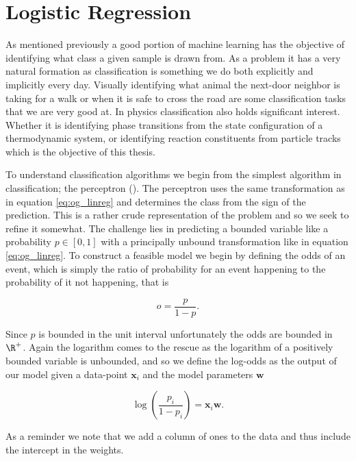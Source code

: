 
\section{Logistic Regression}\label{sec:LogReg}

As mentioned previously a good portion of machine learning has the objective of identifying what class a given sample is drawn from. As a problem it has a very natural formation as classification is something we do both explicitly and implicitly every day. Visually identifying what animal the next-door neighbor is taking for a walk or when it is safe to cross the road are some classification tasks that we are very good at. In physics classification also holds significant interest. Whether it is identifying phase transitions from the state configuration of a thermodynamic system, or identifying reaction constituents from particle tracks which is the objective of this thesis.

To understand classification algorithms we begin from the simplest algorithm in classification; the perceptron (\cite{Rosenblatt1958}). The perceptron uses the same transformation as in equation \ref{eq:og_linreg} and determines the class from the sign of the prediction. This is a rather crude representation of the problem and so we seek to refine it somewhat. The challenge lies in predicting a bounded variable like a probability $p \in [0,1]$ with a principally unbound transformation like in equation \ref{eq:og_linreg}. To construct a feasible model we begin by defining the odds of an event, which is simply the ratio of probability for an event happening to the probability of it not happening, that is 

\begin{equation}\label{eq:odds}
o = \frac{p}{1-p}.
\end{equation}

\noindent Since $p$ is bounded in the unit interval unfortunately the odds are bounded in $\R^+$. Again the logarithm comes to the rescue as the logarithm of a positively bounded variable is unbounded, and so we define the log-odds as the output of our model given a data-point $\mathbf{x}_i$ and the model parameters $\mathbf{w}$

\begin{equation}\label{eq:log_odds}
\log \left(\frac{p_i}{1-p_i}\right) = \mathbf{x}_i\mathbf{w}. 
\end{equation} 

\noindent As a reminder we note that we add a column of ones to the data and thus include the intercept in the weights. 

